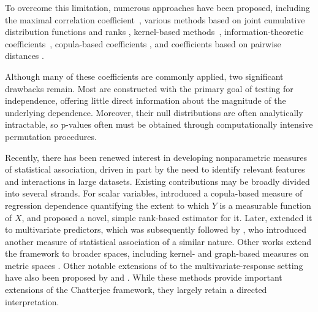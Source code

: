 \documentclass[11pt]{article}
\begin{document}
To overcome this limitation, numerous approaches have been proposed, including the maximal correlation coefficient~\citep{hirschfeld1935connection, gebelein1941statistische, renyi1959measures, breiman1985estimating}, various methods based on joint cumulative distribution functions and
ranks 
\citep{hoeffding1948non, blum1961distribution, yanagimoto1970measures, puri1971nonparametric, rosenblatt1975quadratic, csorgo1985testing, romano1988bootstrap, bergsma2014consistent, nandy2016large, weihs2016efficient, weihs2018symmetric, han2017distribution, wang2017generalized, drton2018high, gamboa2018sensitivity,shi2022distribution, deb2023multivariate, shi2025distribution, zhou2025association},
kernel-based methods~\citep{gretton2005measuring, gretton2008kernel, sen2014testing, pfister2018kernel, zhang2018large}, information-theoretic coefficients~\citep{linfoot1957informational, kraskov2004estimating, reshef2011detecting, berrett2019nonparametric,berrett2021optimal}, copula-based coefficients %
\citep{sklar1959fonctions, schweizer1981nonparametric, dette2013copula, lopez2013randomized, zhang2019bet, griessenberger2022multivariate}, 
and coefficients based on pairwise
distances %
\citep{friedman1983graph, heller2013consistent, lyons2013distance, szekely2009brownian, szekely2007measuring, pan2020ball}. 

Although many of these coefficients are commonly applied, two significant drawbacks remain. Most are constructed with the primary goal of testing for independence, offering little direct information about the magnitude of the underlying dependence. Moreover, their null distributions are often analytically intractable, so p-values often must be obtained through computationally intensive permutation procedures.


Recently, there has been renewed interest in developing nonparametric measures of statistical
association, driven in part by the need to identify relevant features and interactions in large
datasets. Existing contributions may be broadly divided into several strands. For scalar
variables, \citet{dette2013copula} introduced a copula-based measure of regression dependence
quantifying the extent to which $Y$ is a measurable function of $X$, and
\citet{chatterjee2021new} proposed a novel, simple rank-based estimator for it. Later,
\citet{azadkia2021simple} extended it to multivariate predictors, which was subsequently
followed by \citet{azadkia2025new}, who introduced another measure of statistical association of
a similar nature. Other works extend the framework to broader spaces, including kernel- and
graph-based measures on metric spaces \citep{deb2020measuring, wiesel2022measuring, roudaki2026kernel}. Other notable extensions of \citet{chatterjee2021new} to the multivariate-response setting have
also been proposed by \citet{ansari2022simple} and \citet{huang2025multivariate}. While these
methods provide important extensions of the Chatterjee framework, they largely retain a directed
interpretation.
\end{document}
